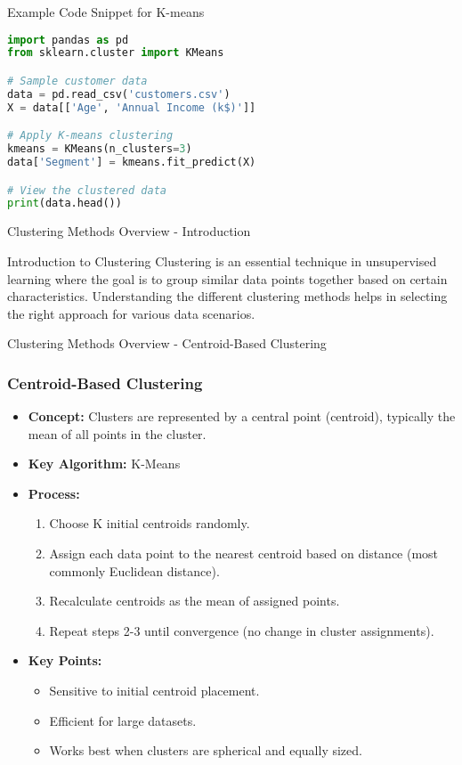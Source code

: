 \documentclass[aspectratio=169]{beamer}
\begin{document}
\begin{frame}[fragile]{Example Code Snippet for K-means}
    \begin{lstlisting}[language=Python]
import pandas as pd
from sklearn.cluster import KMeans

# Sample customer data
data = pd.read_csv('customers.csv')
X = data[['Age', 'Annual Income (k$)']]

# Apply K-means clustering
kmeans = KMeans(n_clusters=3)
data['Segment'] = kmeans.fit_predict(X)

# View the clustered data
print(data.head())
    \end{lstlisting}
\end{frame}

\begin{frame}[fragile]{Clustering Methods Overview - Introduction}
    \begin{block}{Introduction to Clustering}
        Clustering is an essential technique in unsupervised learning where the goal is to group similar data points together based on certain characteristics. Understanding the different clustering methods helps in selecting the right approach for various data scenarios.
    \end{block}
\end{frame}

\begin{frame}[fragile]{Clustering Methods Overview - Centroid-Based Clustering}
    \frametitle{Centroid-Based Clustering}
    \begin{itemize}
        \item \textbf{Concept:} Clusters are represented by a central point (centroid), typically the mean of all points in the cluster.
        \item \textbf{Key Algorithm:} K-Means
        \item \textbf{Process:}
        \begin{enumerate}
            \item Choose K initial centroids randomly.
            \item Assign each data point to the nearest centroid based on distance (most commonly Euclidean distance).
            \item Recalculate centroids as the mean of assigned points.
            \item Repeat steps 2-3 until convergence (no change in cluster assignments).
        \end{enumerate}
        \item \textbf{Key Points:}
        \begin{itemize}
            \item Sensitive to initial centroid placement.
            \item Efficient for large datasets.
            \item Works best when clusters are spherical and equally sized.
        \end{itemize}
    \end{itemize}
\end{frame}
\end{document}
